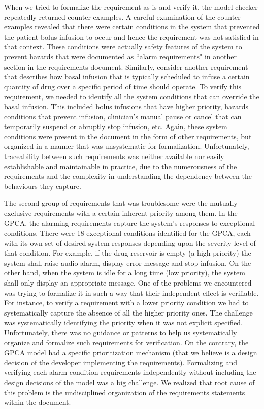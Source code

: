 When we tried to formalize the requirement as is and verify it, the model checker repeatedly returned counter examples. A careful examination of the counter examples revealed that there were certain conditions in the system that prevented the patient bolus infusion to occur and hence the requirement was not satisfied in that context. These conditions were actually safety features of the system to prevent hazards that were documented as ``alarm requirements" in another section in the requirements document.  Similarly, consider another requirement that describes how basal infusion that is typically scheduled to infuse a certain quantity of drug over a specific period of time should operate. To verify this requirement, we needed to identify all the system conditions that can override the basal infusion. This included bolus infusions that have higher priority, hazards conditions that prevent infusion, clinician's manual pause or cancel that can temporarily suspend or abruptly stop infusion, etc. Again, these system conditions were present in the document in the form of other requirements, but organized in a manner that was unsystematic for formalization. Unfortunately, traceability between such requirements was neither available nor easily establishable and maintainable in practice, due to the numerousness of the requirements and the complexity in understanding the dependency between the
behaviours they capture.

The second group of requirements that was troublesome were the mutually exclusive requirements with a certain inherent priority among them. In the GPCA, the alarming requirements capture the system's responses to exceptional conditions. There were 18 exceptional conditions identified for the GPCA, each with its own set of desired system responses depending upon the severity level of that condition. For example, if the drug reservoir is empty (a high priority) the system shall raise audio alarm, display error message and stop infusion. On the other hand, when the system is idle for a long time (low priority), the system shall only display an appropriate message. One of the problems we encountered was trying to formalize it in such a way that their independent effect is verifiable. For instance, to verify a requirement with a lower priority condition we had to systematically capture the absence of all the higher priority ones. The challenge was systematically identifying the priority when it was not explicit specified. Unfortunately, there was no guidance or patterns to help us systematically organize and formalize such requirements for verification. On the contrary, the GPCA model had a specific prioritization mechanism (that we believe is a design decision of the developer implementing the requirements). Formalizing and verifying each alarm condition requirements independently without including the design decisions of the model was a big challenge. We realized that root cause of this problem is the undisciplined organization of the requirements statements within the document.
